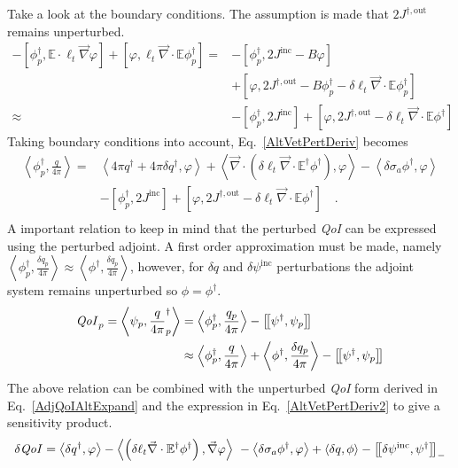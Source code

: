 \documentclass[12pt]{report}
\newcommand{\bra}{\left\langle}
\newcommand{\ket}{\right\rangle}
\newcommand{\sbraSN}{\left[ \! \left[}
\newcommand{\sketSN}{\right] \! \right]}
\newcommand{\sbra}{\left[}
\newcommand{\sket}{\right]}
\renewcommand{\div}{\vec{\nabla} \cdot}
\newcommand{\grad}{\vec{\nabla}}
\newcommand{\Edd}{\mathbb{E}}
\newcommand{\siga}{\sigma_a}
\newcommand{\isigt}{\ell_t}
\newcommand{\angSource}{\frac{q}{4 \pi}}
\newcommand{\angSourcep}{\frac{q_p}{4 \pi}}
\newcommand{\angSourced}{\frac{\delta q_p}{4 \pi}}
\newcommand{\scalResp}{q^\dag}
\newcommand{\qoi}{{\it QoI}\xspace}
\begin{document}
Take a look at the boundary conditions. The assumption is made that $2 J^{\dag,\text{out}}$ remains unperturbed.
\begin{equation}
\begin{split}
 - \sbra \phi^\dag_p, \Edd \cdot \isigt \grad \varphi \sket  + \sbra \varphi, \isigt \div \Edd \phi_p^\dag \sket 
=&- \sbra \phi_p^\dag, 2J^{\text{inc}} - B \varphi \sket \\ 
&+ \sbra \varphi, 2 J^{\dag,\text{out}} - B \phi_p^\dag - \delta \isigt \div \Edd \phi_p^\dag \sket \\
\approx&- \sbra \phi_p^\dag, 2J^{\text{inc}} \sket + \sbra \varphi , 2 J^{\dag,\text{out}} - \delta \isigt \div \Edd \phi^\dag \sket 
\end{split}
\end{equation}
Taking boundary conditions into account, Eq.~\eqref{AltVetPertDeriv} becomes
\begin{equation}
\label{AltVetPertDeriv2}
\begin{split}
 \bra  \phi^\dag_p , \angSource \ket  =& \bra 4 \pi \scalResp + 4 \pi\delta \scalResp , \varphi \ket + \bra\div \left( \delta \isigt \div \Edd^\dag \phi^\dag  \right), \varphi \ket 
- \bra \delta \siga \phi^\dag , \varphi \ket \\
&- \sbra \phi_p^\dag, 2J^{\text{inc}} \sket + \sbra \varphi , 2 J^{\dag,\text{out}} - \delta \isigt \div \Edd \phi^\dag \sket  \quad . \\
\end{split}
\end{equation} 
A important relation to keep in mind that the perturbed \qoi can be expressed using the perturbed adjoint. A first order approximation must be made, namely $\bra \phi^\dag_p ,  \angSourced \ket \approx \bra \phi^\dag , \angSourced \ket$, however, for $\delta q$ and $\delta \psi^{\text{inc}}$ perturbations the adjoint system remains unperturbed so $\phi=\phi^\dag$.
\begin{equation}
\begin{split}
\qoi_p  = \bra \psi_p , \angSource_p^\dag \ket &= \bra \phi^\dag_p , \angSourcep \ket - \sbraSN \psi^\dag,  \psi_p \sketSN \\
&\approx \bra \phi^\dag_p , \angSource \ket + \bra \phi^\dag , \angSourced \ket - \sbraSN \psi^\dag,  \psi_p \sketSN \\
\end{split} 
\end{equation}
The above relation can be combined with the unperturbed \qoi form derived in Eq.~\eqref{AdjQoIAltExpand} and the expression in  Eq.~\eqref{AltVetPertDeriv2} to give a sensitivity product. 
\begin{equation}
\label{AltVETsens}
\delta \qoi = \bra \delta q^\dag, \varphi \ket - \bra\left( \delta \isigt \div \Edd^\dag \phi^\dag  \right), \grad \varphi \ket \
- \bra \delta \siga \phi^\dag , \varphi \ket + \bra \delta q , \phi \ket - \sbraSN \delta \psi^{\text{inc}}, \psi^\dag \sketSN_-
\end{equation}
\end{document}
